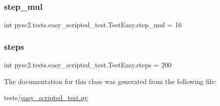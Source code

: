 \subsubsection{\texorpdfstring{step\+\_\+mul}{step\_mul}}
{\footnotesize\ttfamily int pysc2.\+tests.\+easy\+\_\+scripted\+\_\+test.\+Test\+Easy.\+step\+\_\+mul = 16\hspace{0.3cm}{\ttfamily [static]}}

\mbox{\label{classpysc2_1_1tests_1_1easy__scripted__test_1_1_test_easy_afd9dd7b88e7158ab14d8086ae572e330}} 
\subsubsection{\texorpdfstring{steps}{steps}}
{\footnotesize\ttfamily int pysc2.\+tests.\+easy\+\_\+scripted\+\_\+test.\+Test\+Easy.\+steps = 200\hspace{0.3cm}{\ttfamily [static]}}



The documentation for this class was generated from the following file\+:\begin{DoxyCompactItemize}
\item 
tests/\mbox{\hyperlink{easy__scripted__test_8py}{easy\+\_\+scripted\+\_\+test.\+py}}\end{DoxyCompactItemize}
